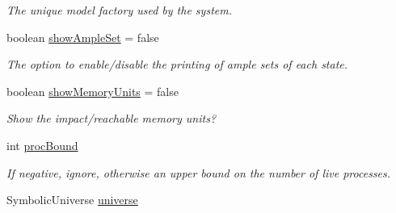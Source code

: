 \begin{DoxyCompactItemize}
\begin{DoxyCompactList}\small\item\em The unique model factory used by the system. \end{DoxyCompactList}\item 
\hypertarget{classedu_1_1udel_1_1cis_1_1vsl_1_1civl_1_1kripke_1_1common_1_1CommonEnabler_ae270bf754bf3f9a9d120b436e7388cb3}{}boolean \hyperlink{classedu_1_1udel_1_1cis_1_1vsl_1_1civl_1_1kripke_1_1common_1_1CommonEnabler_ae270bf754bf3f9a9d120b436e7388cb3}{show\+Ample\+Set} = false\label{classedu_1_1udel_1_1cis_1_1vsl_1_1civl_1_1kripke_1_1common_1_1CommonEnabler_ae270bf754bf3f9a9d120b436e7388cb3}

\begin{DoxyCompactList}\small\item\em The option to enable/disable the printing of ample sets of each state. \end{DoxyCompactList}\item 
\hypertarget{classedu_1_1udel_1_1cis_1_1vsl_1_1civl_1_1kripke_1_1common_1_1CommonEnabler_ac7ba11f545d6e0f962c6bd6823cd1364}{}boolean \hyperlink{classedu_1_1udel_1_1cis_1_1vsl_1_1civl_1_1kripke_1_1common_1_1CommonEnabler_ac7ba11f545d6e0f962c6bd6823cd1364}{show\+Memory\+Units} = false\label{classedu_1_1udel_1_1cis_1_1vsl_1_1civl_1_1kripke_1_1common_1_1CommonEnabler_ac7ba11f545d6e0f962c6bd6823cd1364}

\begin{DoxyCompactList}\small\item\em Show the impact/reachable memory units? \end{DoxyCompactList}\item 
\hypertarget{classedu_1_1udel_1_1cis_1_1vsl_1_1civl_1_1kripke_1_1common_1_1CommonEnabler_a0d1f4be937e2198c84f304b0db7ab3c5}{}int \hyperlink{classedu_1_1udel_1_1cis_1_1vsl_1_1civl_1_1kripke_1_1common_1_1CommonEnabler_a0d1f4be937e2198c84f304b0db7ab3c5}{proc\+Bound}\label{classedu_1_1udel_1_1cis_1_1vsl_1_1civl_1_1kripke_1_1common_1_1CommonEnabler_a0d1f4be937e2198c84f304b0db7ab3c5}

\begin{DoxyCompactList}\small\item\em If negative, ignore, otherwise an upper bound on the number of live processes. \end{DoxyCompactList}\item 
\hypertarget{classedu_1_1udel_1_1cis_1_1vsl_1_1civl_1_1kripke_1_1common_1_1CommonEnabler_a7444d706efa2b7a32d218647f97dab98}{}Symbolic\+Universe \hyperlink{classedu_1_1udel_1_1cis_1_1vsl_1_1civl_1_1kripke_1_1common_1_1CommonEnabler_a7444d706efa2b7a32d218647f97dab98}{universe}\label{classedu_1_1udel_1_1cis_1_1vsl_1_1civl_1_1kripke_1_1common_1_1CommonEnabler_a7444d706efa2b7a32d218647f97dab98}


\end{DoxyCompactItemize}

